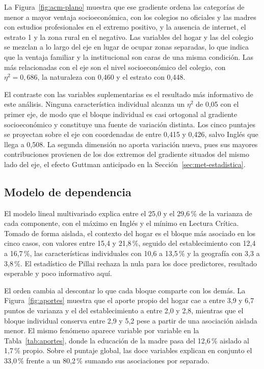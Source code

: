 \documentclass[12pt]{article}
\newcommand{\tabla}[1]{}
\begin{document}
La Figura~\ref{fig:acm-plano} muestra que ese gradiente ordena las categorías de menor a mayor
ventaja socioeconómica, con los colegios no oficiales y las madres con estudios profesionales en
el extremo positivo, y la ausencia de internet, el estrato 1 y la zona rural en el negativo. Las variables del hogar y las del colegio se mezclan a lo largo del
eje en lugar de ocupar zonas separadas, lo que indica que la ventaja familiar y la institucional
son caras de una misma condición. Las más relacionadas con el eje son el nivel
socioeconómico del colegio, con $\eta^2 = 0{,}686$, la naturaleza con 0,460 y el estrato con 0,448.

El contraste con las variables suplementarias es el resultado más informativo de este análisis.
Ninguna característica individual alcanza un $\eta^2$ de 0,05 con el primer eje, de modo que el
bloque individual es casi ortogonal al gradiente socioeconómico y constituye una fuente de
variación distinta. Los cinco puntajes se proyectan sobre el eje con coordenadas de entre 0,415 y
0,426, salvo Inglés que llega a 0,508. La segunda dimensión no aporta variación nueva, pues sus
mayores contribuciones provienen de los dos extremos del gradiente situados del mismo lado del
eje, el efecto Guttman anticipado en la Sección~\ref{sec:met-estadistica}.

\subsection{Modelo de dependencia}

El modelo lineal multivariado explica entre el 25,0 y el 29,6\,\% de la varianza de cada
componente, con el máximo en Inglés y el mínimo en Lectura Crítica. Tomado de forma aislada, el
contexto del hogar es el bloque más asociado en los cinco casos, con valores entre 15,4 y
21,8\,\%, seguido del establecimiento con 12,4 a 16,7\,\%, las características individuales con
10,6 a 13,5\,\% y la geografía con 3,3 a 3,8\,\%. El estadístico de Pillai rechaza la nula para
los doce predictores, resultado esperable y poco informativo aquí.

\tabla{tab-aportes}

El orden cambia al descontar lo que cada bloque comparte con los demás. La
Figura~\ref{fig:aportes} muestra que el aporte propio del hogar cae a entre 3,9 y 6,7 puntos de
varianza y el del establecimiento a entre 2,0 y 2,8, mientras que el bloque individual conserva
entre 2,9 y 5,2 pese a partir de una asociación aislada menor. El mismo fenómeno aparece variable
por variable en la Tabla~\ref{tab:aportes}, donde la educación de la madre pasa del 12,6\,\%
aislado al 1,7\,\% propio. Sobre el puntaje global, las doce variables explican en conjunto el
33,0\,\% frente a un 80,2\,\% sumando sus asociaciones por separado.
\end{document}
